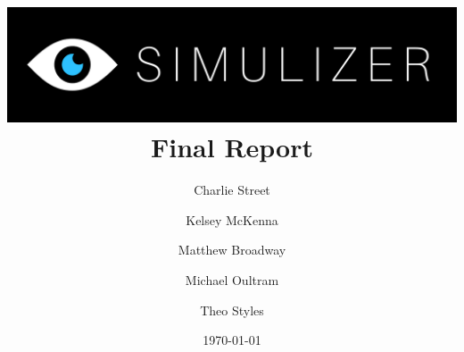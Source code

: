 \documentclass[12pt, a4paper]{article}
\title{
  \includegraphics[width=\textwidth]{segments/SimulizerLogo.png}
  \huge\textbf{Final Report}
}
\author{
  Charlie Street
  \and
  Kelsey McKenna
  \and
  Matthew Broadway
  \and
  Michael Oultram
  \and
  Theo Styles
}
\date{\today}
\begin{document}
\maketitle

\begin{abstract}
\noindent\lipsum[1]
\end{abstract}

\clearpage
\tableofcontents
\clearpage











\end{document}
